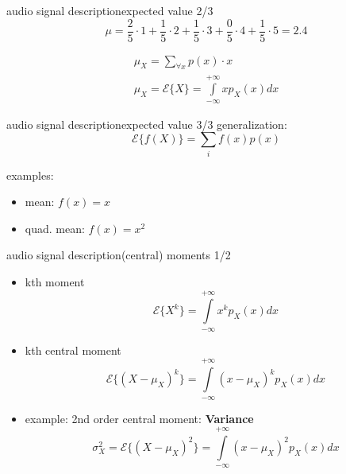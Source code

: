 \begin{frame}{audio signal description}{expected value 2/3}
	\begin{equation*}
		\mu = \frac{2}{5}\cdot 1 + \frac{1}{5}\cdot 2 + \frac{1}{5}\cdot 3 + \frac{0}{5}\cdot 4 + \frac{1}{5}\cdot 5  = 2.4
	\end{equation*}
	
	\pause
	\begin{eqnarray*}
		\mu_X 	= \sum\limits_{\forall x} p(x)\cdot x\\
		\mu_X=\mathcal{E}\lbrace   X\rbrace  =\int\limits_{-\infty}^{+\infty}xp_X(x)dx
	\end{eqnarray*}
\end{frame}		
\begin{frame}{audio signal description}{expected value 3/3}
	generalization:
	\begin{equation*}
		\mathcal{E}\lbrace   f(X)\rbrace  = \sum\limits_i f(x)p(x)
	\end{equation*}

	\pause
	examples:
	\begin{itemize}
		\item	mean: $f(x) = x$
		\item	quad. mean: $f(x) = x^2$
	\end{itemize}
\end{frame}		

\begin{frame}{audio signal description}{(central) moments 1/2}
	\begin{itemize}
		\item	kth moment
			\begin{equation*}
				\mathcal{E}\lbrace  X^k\rbrace  = \int\limits_{-\infty}^{+\infty}x^kp_X(x)dx
			\end{equation*}
		\pause
		\item kth central moment
			\begin{equation*}
				\mathcal{E}\lbrace  (X-\mu_X)^k\rbrace  = \int\limits_{-\infty}^{+\infty}(x-\mu_X)^k p_X(x)dx
			\end{equation*}

		\pause
		\item	example: 2nd order central moment: \textbf{Variance}
			\begin{equation*}
				\sigma_X^2 = \mathcal{E}\lbrace  (X-\mu_X)^2\rbrace  = \int\limits_{-\infty}^{+\infty}(x-\mu_X)^2 p_X(x)dx
			\end{equation*}
	\end{itemize}
\end{frame}		

